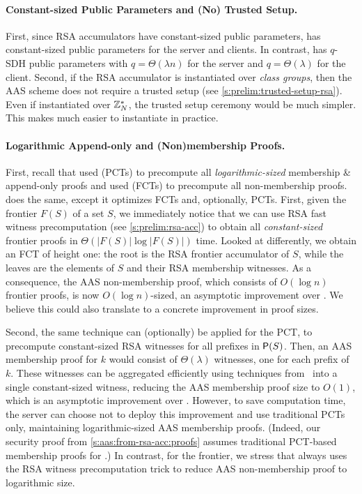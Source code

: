 \paragraph{Constant-sized Public Parameters and (No) Trusted Setup.}
First, since RSA accumulators have constant-sized public parameters, \rsaaas has constant-sized public parameters for the server and clients.
In contrast, \biaas has $q$-SDH public parameters with $q=\Theta(\lambda n)$ for the server and $q=\Theta(\lambda)$ for the client.
Second, if the RSA accumulator is instantiated over \textit{class groups}, then the AAS scheme does not require a trusted setup (see \cref{s:prelim:trusted-setup-rsa}).
Even if instantiated over $\mathbb{Z}_N^*$, the trusted setup ceremony would be much simpler.
This makes \rsaaas much easier to instantiate in practice.

\paragraph{Logarithmic Append-only and (Non)membership Proofs.}
First, recall that \biaas used \textit{\prefixCommunionTrees} (PCTs) to precompute all \textit{logarithmic-sized} membership \& append-only proofs and used \textit{\frontierCommunionTrees} (FCTs) to precompute all non-membership proofs.
\rsaaas does the same, except it optimizes FCTs and, optionally, PCTs.
First, given the frontier $F(S)$ of a set $S$, we immediately notice that we can use RSA fast witness precomputation (see \cref{s:prelim:rsa-acc}) to obtain all \textit{constant-sized} frontier proofs in $\Theta(|F(S)|\log{|F(S)|})$ time.
Looked at differently, we obtain an FCT of height one: the root is the RSA frontier accumulator of $S$, while the leaves are the elements of $S$ and their RSA membership witnesses.
As a consequence, the AAS non-membership proof, which consists of $O(\log{n})$ frontier proofs, is now $O(\log{n})$-sized, an asymptotic improvement over \biaas.
We believe this could also translate to a concrete improvement in proof sizes.

Second, the same technique can (optionally) be applied for the PCT, to precompute constant-sized RSA witnesses for all prefixes in $\mathsf{P}(S)$.
Then, an AAS membership proof for $k$ would consist of $\Theta(\lambda)$ witnesses, one for each prefix of $k$.
These witnesses can be aggregated efficiently using techniques from~\cite{BBF19} into a single constant-sized witness, reducing the AAS membership proof size to $O(1)$, which is an asymptotic improvement over \biaas.
However, to save computation time, the server can choose not to deploy this improvement and use traditional PCTs only, maintaining logarithmic-sized AAS membership proofs.
(Indeed, our security proof from \cref{s:aas:from-rsa-acc:proofs} assumes traditional PCT-based membership proofs for \rsaaas.)
In contrast, for the frontier, we stress that \rsaaas always uses the RSA witness precomputation trick to reduce AAS non-membership proof to logarithmic size.

